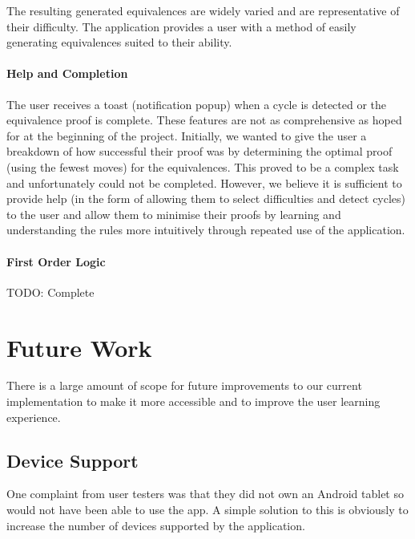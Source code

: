 \documentclass{report}
\begin{document}
The resulting generated equivalences are widely varied and are representative of their difficulty. The application provides a user with a method of easily generating equivalences suited to their ability.

\subsubsection{Help and Completion}

The user receives a toast (notification popup) when a cycle is detected or the equivalence proof is complete. These features are not as comprehensive as hoped for at the beginning of the project. Initially, we wanted to give the user a breakdown of how successful their proof was by determining the optimal proof (using the fewest moves) for the equivalences. This proved to be a complex task and unfortunately could not be completed. However, we believe it is sufficient to provide help (in the form of allowing them to select difficulties and detect cycles) to the user and allow them to minimise their proofs by learning and understanding the rules more intuitively through repeated use of the application.

\subsubsection{First Order Logic}

TODO: Complete


\chapter{Future Work}

There is a large amount of scope for future improvements to our current implementation to make it more accessible and to improve the user learning experience.

\section{Device Support}

One complaint from user testers was that they did not own an Android tablet so would not have been able to use the app. A simple solution to this is obviously to increase the number of devices supported by the application. 
\end{document}
